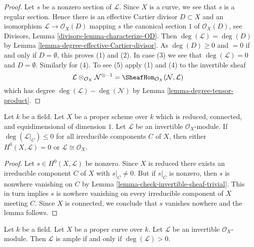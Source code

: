 \begin{proof}
Let $s$ be a nonzero section of $\mathcal{L}$. Since $X$ is a curve, we
see that $s$ is a regular section. Hence there is an effective
Cartier divisor $D \subset X$ and an isomorphism
$\mathcal{L} \to \mathcal{O}_X(D)$ mapping $s$ the canonical
section $1$ of $\mathcal{O}_X(D)$, see
Divisors, Lemma \ref{divisors-lemma-characterize-OD}.
Then $\deg(\mathcal{L}) = \deg(D)$ by
Lemma \ref{lemma-degree-effective-Cartier-divisor}.
As $\deg(D) \geq 0$ and $= 0$
if and only if $D = \emptyset$, this proves (1) and (2).
In case (3) we see that $\deg(\mathcal{L}) = 0$ and
$D = \emptyset$. Similarly for (4). To see (5) apply
(1) and (4) to the invertible sheaf
$$
\mathcal{L} \otimes_{\mathcal{O}_X} \mathcal{N}^{\otimes -1} =
\SheafHom_{\mathcal{O}_X}(\mathcal{N}, \mathcal{L})
$$
which has degree $\deg(\mathcal{L}) - \deg(\mathcal{N})$
by Lemma \ref{lemma-degree-tensor-product}.
\end{proof}

\begin{lemma}
\label{lemma-no-sections-dual-nef}
Let $k$ be a field. Let $X$ be a proper scheme over $k$
which is reduced, connected, and equidimensional of dimension $1$.
Let $\mathcal{L}$ be an invertible $\mathcal{O}_X$-module.
If $\deg(\mathcal{L}|_C) \leq 0$ for all irreducible components $C$
of $X$, then either $H^0(X, \mathcal{L}) = 0$ or
$\mathcal{L} \cong \mathcal{O}_X$.
\end{lemma}

\begin{proof}
Let $s \in H^0(X, \mathcal{L})$ be nonzero. Since $X$ is reduced there exists
an irreducible component $C$ of $X$ with $s|_C \not = 0$.
But if $s|_C$ is nonzero, then
$s$ is nonwhere vanishing on $C$ by
Lemma \ref{lemma-check-invertible-sheaf-trivial}.
This in turn implies $s$ is nowhere vanishing on
every irreducible component of $X$ meeting $C$.
Since $X$ is connected, we conclude that $s$
vanishes nowhere and the lemma follows.
\end{proof}

\begin{lemma}
\label{lemma-ample-curve}
Let $k$ be a field. Let $X$ be a proper curve over $k$.
Let $\mathcal{L}$ be an invertible $\mathcal{O}_X$-module.
Then $\mathcal{L}$ is ample if and only if $\deg(\mathcal{L}) > 0$.
\end{lemma}

